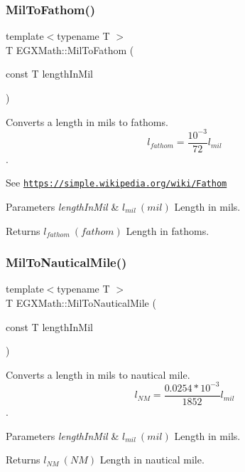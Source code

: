\subsubsection{\texorpdfstring{Mil\+To\+Fathom()}{MilToFathom()}}
{\footnotesize\ttfamily template$<$typename T $>$ \\
T E\+G\+X\+Math\+::\+Mil\+To\+Fathom (\begin{DoxyParamCaption}\item[{const T}]{length\+In\+Mil }\end{DoxyParamCaption})}



Converts a length in mils to fathoms. \[ l_{fathom}= \frac{10^{-3}}{72} l_{mil} \]. 

See \href{https://simple.wikipedia.org/wiki/Fathom}{\tt https\+://simple.\+wikipedia.\+org/wiki/\+Fathom} 
\begin{DoxyParams}{Parameters}
{\em length\+In\+Mil} & $ l_{mil}\ (mil)$ Length in mils. \\
\hline
\end{DoxyParams}
\begin{DoxyReturn}{Returns}
$ l_{fathom}\ (fathom)$ Length in fathoms. 
\end{DoxyReturn}
\mbox{\label{group___e_g_x_math-_conversions-_length_conversions-_imperial-_mil-_nautical_ga1119f841677015f7cd73282f344fa257}} 
\subsubsection{\texorpdfstring{Mil\+To\+Nautical\+Mile()}{MilToNauticalMile()}}
{\footnotesize\ttfamily template$<$typename T $>$ \\
T E\+G\+X\+Math\+::\+Mil\+To\+Nautical\+Mile (\begin{DoxyParamCaption}\item[{const T}]{length\+In\+Mil }\end{DoxyParamCaption})}



Converts a length in mils to nautical mile. \[ l_{NM}= \frac{0.0254 * 10^{-3}}{1852} l_{mil} \]. 


\begin{DoxyParams}{Parameters}
{\em length\+In\+Mil} & $ l_{mil}\ (mil)$ Length in mils. \\
\hline
\end{DoxyParams}
\begin{DoxyReturn}{Returns}
$ l_{NM}\ (NM)$ Length in nautical mile. 
\end{DoxyReturn}
